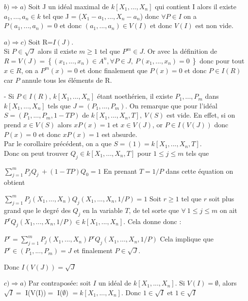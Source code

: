 \documentclass[10pt, twoside]{article}
\theoremstyle{plain}
\theoremstyle{definition}
\theoremstyle{plain}
\theoremstyle{plain}
\theoremstyle{definition}
\theoremstyle{remark}
\begin{document}
\item[•] $ b) \Rightarrow a) $ Soit J un idéal maximal de $k[X_{1},...,X_{n}] $ qui contient I alors il existe $a_{1},..., a_{n} \in  k $ tel que J = ($X_{1} - a_{1}, ... ,  X_{n} - a_{n}$) donc $\forall P \in I$ on a $P(a_{1},..., a_{n}) = 0$ et donc $(a_{1},..., a_{n}) \in V(I) $ et donc $V(I)$ est non vide.
\\ \item[•] $ a) \Rightarrow c) $ Soit R=$I(J)$. 
\\ Si $ P \in \sqrt{J} $ alors il existe $m \geq 1$ tel que $ P ^{m} \in J$. Or avec la définition de $R =V(J) = \left\{  (x_{1}, ... , x_{n}) \in A^{n} , \forall P \in J , \ P(x_{1}, ... , x_{n}) = 0 \ \right\}$ donc pour tout $x \in R$, on a $P^{m}(x) = 0$ et donc finalement que $P(x) = 0$ et donc $P \in I(R)$ car $P$ annule tous les éléments de R.

- Si $P \in I(R)$, $k[X_{1},...,X_{n}] $ étant noethérien, il existe $P_{1},..., P_{m} $ dans $k[X_{1},...,X_{n}] $ tels que $J = (P_{1},..., P_{m})$. On remarque que pour l'idéal $ S = (P_{1},..., P_{m},1-TP) $ de $k[X_{1},...,X_{n},T]  ,\ V(S) $ est vide. En effet, si on prend $x \in V(S)$ alors $xP(x) = 1$ et $x \in V(J)$, or $P \in I(V(J))$ donc $P(x) = 0$ et donc $xP(x) = 1$ est absurde.\\ Par le corollaire précédent, on a que $S = (1) =k[X_{1},...,X_{n},T]$. \\
Donc on peut trouver $Q_{j} \in k[X_{1},...,X_{n},T]$ pour $1 \le j \le m$ tels que 

\centering 
$\sum_{j = 1}^m P_{j}Q_{j} \ + (1- TP)Q_{0} = 1$
\flushleft En prenant $T= 1/P$ dans cette équation on obtient

\centering $\sum_{j = 1}^m P_{j}(X_{1},...,X_{n})Q_{j}(X_{1},...,X_{n},1/P)  = 1$
\flushleft Soit $ r\geq 1$ tel que $r$ soit plus grand que le degré des $Q_{j}$ en la variable $T$, de tel sorte que $ \forall \ 1 \le j \le m$ on ait $P^{r} Q_{j}(X_{1},...,X_{n},1/P) \in k[X_{1},...,X_{n}]$. Cela donne donc :

\centering $P^{r} = \sum_{j = 1}^m P_{j}(X_{1},...,X_{n})P^{r}Q_{j}(X_{1},...,X_{n},1/P) $ 
\flushleft Cela implique que $P^{r} \in (P_{1},..., P_{m}) = J$ et finalement $P \in \sqrt{J}$.

Donc $I(V(J)) = \sqrt{J}$

\item[•] $ c) \Rightarrow a) $ Par contraposée: soit $I$ un idéal de $k[X_{1},...,X_{n}]$. Si $V(I) = \emptyset$, alors $\sqrt{I} = $ I(V(I))$   =   $ I($\emptyset$) $= k[X_{1},...,X_{n}]$. Donc $1 \in \sqrt{I} $ et $  1 \in \sqrt{I} $ 
\end{document}
